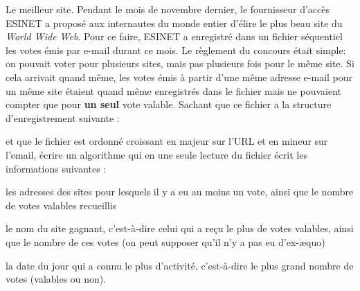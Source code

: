 \begin{Exercice}{Le meilleur site.}
	Pendant le mois de novembre dernier, le fournisseur d’accès ESINET a
	proposé aux internautes du monde entier d’élire le plus beau site du
	\textit{World Wide Web}. Pour ce faire, ESINET a enregistré dans un
	fichier séquentiel  les votes émis par e-mail durant ce mois. Le
	règlement du concours était simple: on pouvait voter pour plusieurs
	sites, mais pas plusieurs fois pour le même site. Si cela arrivait
	quand même, les votes émis à partir d’une même adresse e-mail pour un
	même site étaient quand même enregistrés dans le fichier  mais ne
	pouvaient compter que pour \textbf{un seul} vote valable. Sachant que
	ce fichier a la structure d’enregistrement suivante :


	et que le fichier est ordonné croissant en majeur sur
	l'URL et en mineur sur l'email,
	écrire un algorithme qui en une seule lecture du fichier écrit les
	informations suivantes :

	\begin{liste}
		\item 
			les adresses des sites pour lesquels il y a eu au moins un vote, ainsi
			que le nombre de votes valables recueillis 
		\item 
			le nom du site gagnant, c’est-à-dire celui qui a reçu le plus de votes
			valables, ainsi que le nombre de ces votes (on peut supposer qu’il n’y
			a pas eu d’ex-æquo)
		\item 
			la date du jour qui a connu le plus d’activité, c’est-à-dire le plus
			grand nombre de votes (valables ou non).
	\end{liste}
\end{Exercice}	

